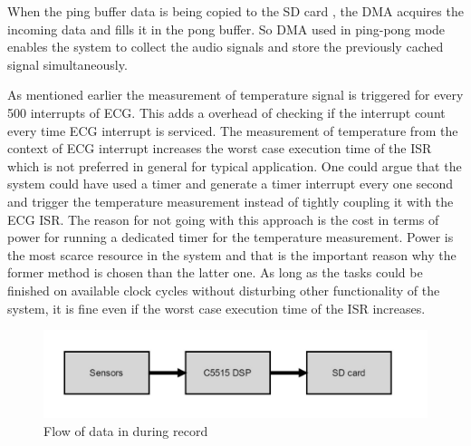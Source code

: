  When the ping buffer data is being copied to the SD card , the DMA acquires the incoming data and fills it in the pong buffer. So DMA used in ping-pong mode enables the system to collect the audio signals and store the previously cached signal simultaneously. 
 
 As mentioned earlier the measurement of temperature signal is triggered for every 500 interrupts of ECG. This adds a overhead of checking if the interrupt count every time ECG interrupt is serviced. The measurement of temperature from the context of ECG interrupt increases the worst case execution time of the ISR which is not preferred in general for typical application. One could argue that the system could have used a timer and generate a timer interrupt every one second and trigger the temperature measurement instead of tightly coupling it with the ECG ISR. The reason for not going with this approach is the cost in terms of power for running a dedicated timer for the temperature measurement. Power is the most scarce resource in the system and that is the important reason why the former method is chosen than the latter one. As long as the tasks could be finished on available clock cycles without disturbing other functionality of the system, it is fine even if the worst case execution time of the ISR increases.
 \begin{figure}[h]
 	\centering
 	\includegraphics[scale = 0.5 ]{record_dataflow.JPG}
 	\caption{Flow of data in during record\label{record_datalow}}
 \end{figure}

